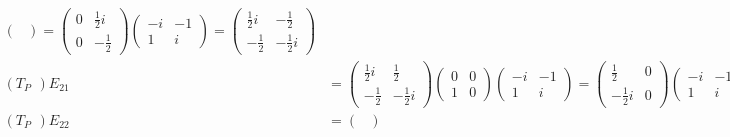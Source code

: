 \documentclass{article}
\DeclareMathOperator{\adj}{^\ast}
\begin{document}
\begin{align*}
\begin{pmatrix}
                                                      \end{pmatrix}
    = \begin{pmatrix}
          0 & \frac 1 2 i \\
          0 & - \frac 1 2
      \end{pmatrix} \begin{pmatrix}
                        -i & -1 \\
                        1  & i
                    \end{pmatrix} =
    \begin{pmatrix}
        \frac 1 2 i & - \frac 1 2   \\
        - \frac 1 2 & - \frac 1 2 i
    \end{pmatrix}                                      \\
    (T_{P\adj})E_{21} & = \begin{pmatrix}
                              \frac 1 2 i & \frac 1 2    \\
                              -\frac 1 2  & -\frac 1 2 i
                          \end{pmatrix} \begin{pmatrix}
                                            0 & 0 \\
                                            1 & 0
                                        \end{pmatrix} \begin{pmatrix}
                                                          -i & -1 \\
                                                          1  & i
                                                      \end{pmatrix}
    = \begin{pmatrix}
          \frac 1 2    & 0 \\
          -\frac 1 2 i & 0
      \end{pmatrix} \begin{pmatrix}
                        -i & -1 \\
                        1  & i
                    \end{pmatrix} =
    \begin{pmatrix}
        - \frac 1 2 i & - \frac 1 2 \\
        \frac 1 2     & \frac 1 2 i
    \end{pmatrix}                                      \\
    (T_{P\adj})E_{22} & = \begin{pmatrix}

\end{pmatrix}
\end{align*}
\end{document}
